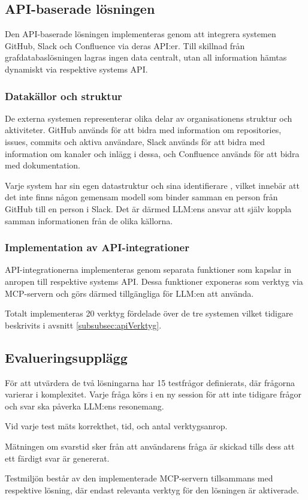 \subsection{API-baserade lösningen}\label{subsec:overview4}

Den API-baserade lösningen implementeras genom att integrera systemen GitHub, Slack och Confluence via deras API:er.
Till skillnad från grafdatabaslösningen lagras ingen data centralt, utan all information hämtas dynamiskt via respektive systems API.

\subsubsection{Datakällor och struktur}
De externa systemen representerar olika delar av organisationens struktur och aktiviteter.
GitHub används för att bidra med information om repositories, issues, commits och aktiva användare, Slack används för att bidra med information om kanaler och inlägg i dessa, och Confluence används för att bidra med dokumentation.

Varje system har sin egen datastruktur och sina identifierare
, vilket innebär att det inte finns någon gemensam modell som binder samman en person från GitHub till en person i Slack.
Det är därmed LLM:ens ansvar att själv koppla samman informationen från de olika källorna.

\subsubsection{Implementation av API-integrationer}

API-integrationerna implementeras genom separata funktioner som kapslar in anropen till respektive systems API.
Dessa funktioner exponeras som verktyg via MCP-servern och görs därmed tillgängliga för LLM:en att använda.

Totalt implementeras 20 verktyg fördelade över de tre systemen vilket tidigare beskrivits i avsnitt \ref{subsubsec:apiVerktyg}.

\subsection{Evalueringsupplägg}\label{subsec:eval_setup} 

För att utvärdera de två lösningarna har 15 testfrågor definierats, där frågorna varierar i komplexitet.
Varje fråga körs i en ny session för att inte tidigare frågor och svar ska påverka LLM:ens resonemang.

Vid varje test mäts korrekthet, tid, och antal verktygsanrop.

Mätningen om svarstid sker från att användarens fråga är skickad tills dess att ett färdigt svar är genererat.

Testmiljön består av den implementerade MCP-servern tillsammans med respektive lösning, där endast relevanta verktyg för den lösningen är aktiverade.


